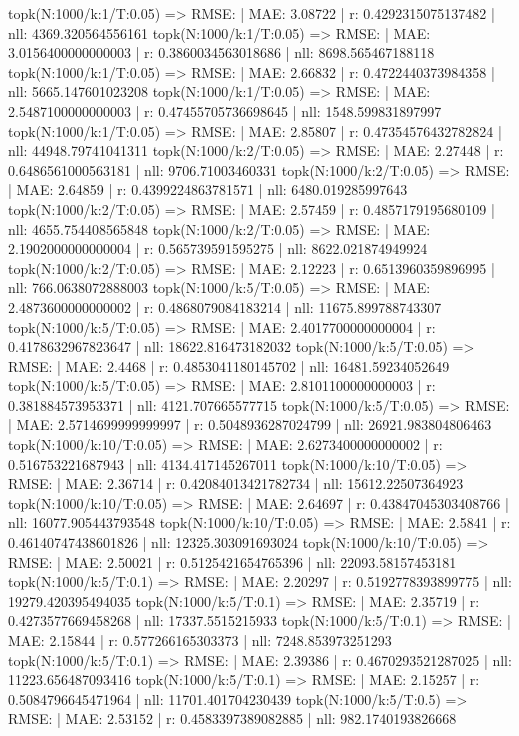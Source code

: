 topk(N:1000/k:1/T:0.05) => RMSE: | MAE: 3.08722 | r: 0.4292315075137482 | nll: 4369.320564556161
topk(N:1000/k:1/T:0.05) => RMSE: | MAE: 3.0156400000000003 | r: 0.3860034563018686 | nll: 8698.565467188118
topk(N:1000/k:1/T:0.05) => RMSE: | MAE: 2.66832 | r: 0.4722440373984358 | nll: 5665.147601023208
topk(N:1000/k:1/T:0.05) => RMSE: | MAE: 2.5487100000000003 | r: 0.47455705736698645 | nll: 1548.599831897997
topk(N:1000/k:1/T:0.05) => RMSE: | MAE: 2.85807 | r: 0.47354576432782824 | nll: 44948.79741041311
topk(N:1000/k:2/T:0.05) => RMSE: | MAE: 2.27448 | r: 0.6486561000563181 | nll: 9706.71003460331
topk(N:1000/k:2/T:0.05) => RMSE: | MAE: 2.64859 | r: 0.4399224863781571 | nll: 6480.019285997643
topk(N:1000/k:2/T:0.05) => RMSE: | MAE: 2.57459 | r: 0.4857179195680109 | nll: 4655.754408565848
topk(N:1000/k:2/T:0.05) => RMSE: | MAE: 2.1902000000000004 | r: 0.565739591595275 | nll: 8622.021874949924
topk(N:1000/k:2/T:0.05) => RMSE: | MAE: 2.12223 | r: 0.6513960359896995 | nll: 766.0638072888003
topk(N:1000/k:5/T:0.05) => RMSE: | MAE: 2.4873600000000002 | r: 0.4868079084183214 | nll: 11675.899788743307
topk(N:1000/k:5/T:0.05) => RMSE: | MAE: 2.4017700000000004 | r: 0.4178632967823647 | nll: 18622.816473182032
topk(N:1000/k:5/T:0.05) => RMSE: | MAE: 2.4468 | r: 0.4853041180145702 | nll: 16481.59234052649
topk(N:1000/k:5/T:0.05) => RMSE: | MAE: 2.8101100000000003 | r: 0.381884573953371 | nll: 4121.707665577715
topk(N:1000/k:5/T:0.05) => RMSE: | MAE: 2.5714699999999997 | r: 0.5048936287024799 | nll: 26921.983804806463
topk(N:1000/k:10/T:0.05) => RMSE: | MAE: 2.6273400000000002 | r: 0.516753221687943 | nll: 4134.417145267011
topk(N:1000/k:10/T:0.05) => RMSE: | MAE: 2.36714 | r: 0.42084013421782734 | nll: 15612.22507364923
topk(N:1000/k:10/T:0.05) => RMSE: | MAE: 2.64697 | r: 0.43847045303408766 | nll: 16077.905443793548
topk(N:1000/k:10/T:0.05) => RMSE: | MAE: 2.5841 | r: 0.46140747438601826 | nll: 12325.303091693024
topk(N:1000/k:10/T:0.05) => RMSE: | MAE: 2.50021 | r: 0.5125421654765396 | nll: 22093.58157453181
topk(N:1000/k:5/T:0.1) => RMSE: | MAE: 2.20297 | r: 0.5192778393899775 | nll: 19279.420395494035
topk(N:1000/k:5/T:0.1) => RMSE: | MAE: 2.35719 | r: 0.4273577669458268 | nll: 17337.5515215933
topk(N:1000/k:5/T:0.1) => RMSE: | MAE: 2.15844 | r: 0.577266165303373 | nll: 7248.853973251293
topk(N:1000/k:5/T:0.1) => RMSE: | MAE: 2.39386 | r: 0.4670293521287025 | nll: 11223.656487093416
topk(N:1000/k:5/T:0.1) => RMSE: | MAE: 2.15257 | r: 0.5084796645471964 | nll: 11701.401704230439
topk(N:1000/k:5/T:0.5) => RMSE: | MAE: 2.53152 | r: 0.4583397389082885 | nll: 982.1740193826668
